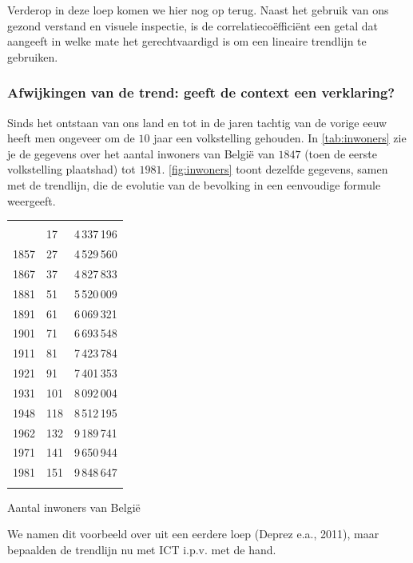 \begin{multicols}{2}
Verderop in deze loep komen we hier nog op terug. Naast het gebruik van ons gezond verstand en visuele inspectie, is de correlatiecoëfficiënt een getal dat aangeeft in welke mate het gerechtvaardigd is om een lineaire trendlijn te gebruiken.

    \subsubsection*{Afwijkingen van de trend: geeft de context een verklaring?}

Sinds het ontstaan van ons land en tot in de jaren tachtig van de vorige eeuw heeft men ongeveer om de $10$ jaar een volkstelling gehouden. In \autoref{tab:inwoners} zie je de gegevens over het aantal inwoners van België van $1847$ (toen de eerste volkstelling plaatshad) tot $1981$. \autoref{fig:inwoners} toont dezelfde gegevens, samen met de trendlijn, die de evolutie van de bevolking in een eenvoudige formule weergeeft.

\begin{tabel}
	\begin{tabular}{C{1.0cm} C{2.65cm} C{3.25cm}}
		\hlinethick
		 &  &  \\
		 & 17 & 4\,337\,196 \\
        1857 & 27 & 4\,529\,560 \\
        1867 & 37 & 4\,827\,833 \\
        1881 & 51 & 5\,520\,009 \\
        1891 & 61 & 6\,069\,321 \\
        1901 & 71 & 6\,693\,548 \\
        1911 & 81 & 7\,423\,784 \\
        1921 & 91 & 7\,401\,353 \\
        1931 & 101 & 8\,092\,004 \\
        1948 & 118 & 8\,512\,195 \\
        1962 & 132 & 9\,189\,741 \\
        1971 & 141 & 9\,650\,944 \\
        1981 & 151 & 9\,848\,647 \\
		\hlinethick
		\end{tabular}
	\caption{Aantal inwoners van België} \label{tab:inwoners}
\end{tabel}


We namen dit voorbeeld over uit een eerdere loep (Deprez e.a., 2011), maar bepaalden de trendlijn nu met ICT i.p.v. met de hand. 


\end{multicols}
